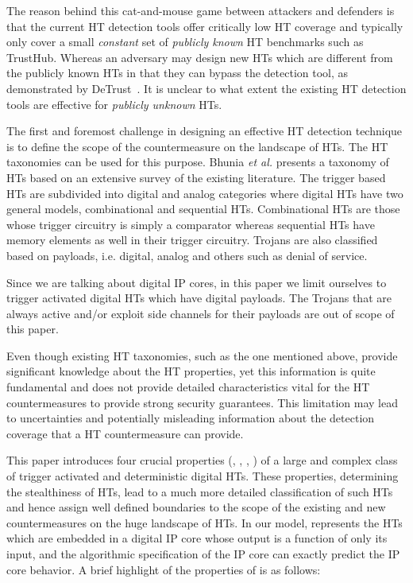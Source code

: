 \documentclass[10pt,journal,compsoc]{IEEEtran}
\begin{document}
The reason behind this cat-and-mouse game between attackers and defenders is that the current HT detection tools offer critically low HT coverage and typically only cover a small \textit{constant} set of \textit{publicly known} HT benchmarks such as TrustHub.
Whereas an adversary may design new HTs which are different from the publicly known HTs in that they can bypass the detection tool, as demonstrated by DeTrust~\cite{detrust}.
It is unclear to what extent the existing HT detection tools are effective for \textit{publicly unknown} HTs.



The first and foremost challenge in designing an effective HT detection technique is to define the scope of the countermeasure on the landscape of HTs.
The HT taxonomies can be used for this purpose.
Bhunia {\em et al.} \cite{ieeesurvey} presents a taxonomy of HTs
based on an extensive survey of the existing literature.
The trigger based HTs are subdivided into digital and analog categories where digital HTs have two general models, combinational and sequential HTs.
Combinational HTs are those whose trigger circuitry is simply a comparator whereas sequential HTs have memory elements as well in their trigger circuitry.
Trojans are also classified based on payloads, i.e. digital, analog and others such as denial of service.


Since we are talking about digital IP cores, in this paper we limit ourselves to trigger activated digital HTs which have digital payloads. 
The Trojans that are always active and/or exploit side channels for their payloads are out of scope of this paper.


Even though existing HT taxonomies, such as the one mentioned above, provide significant knowledge about the HT properties, yet this information is quite fundamental and does not provide detailed characteristics vital for the HT countermeasures to provide strong security guarantees.
This limitation may lead to uncertainties and potentially misleading information about the detection coverage that a HT countermeasure can provide.



This paper introduces four crucial properties (, , , ) of a large and complex class  of trigger activated and deterministic digital HTs.
These properties, determining the stealthiness of HTs, lead to a much more detailed classification of such HTs and hence assign well defined boundaries to the scope of the existing and new countermeasures on the huge landscape of HTs.
In our model,  represents the HTs which are embedded in a digital IP core whose output is a function of only its input, and the algorithmic specification of the IP core can exactly predict the IP core behavior.
A brief highlight of the properties of  is as follows:
\end{document}
